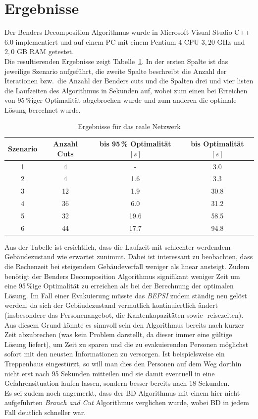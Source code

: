 \documentclass[a4paper, 11pt]{scrreprt}
\begin{document}
\section{Ergebnisse}
Der Benders Decomposition Algorithmus wurde in Microsoft Visual Studio C++ 6.0 implementiert und auf einem
PC mit einem Pentium $4$ CPU $3,20$ GHz und $2,0$ GB RAM getestet.\\
Die resultierenden Ergebnisse zeigt Tabelle~\ref{tab:ergebnisse}. In der ersten Spalte ist das jeweilige
Szenario aufgeführt, die zweite Spalte beschreibt die Anzahl der Iterationen bzw.\ die Anzahl der Benders
cuts und die Spalten drei und vier listen die Laufzeiten des Algorithmus in Sekunden auf, wobei
zum einen bei Erreichen von 95\,\%iger Optimalität abgebrochen wurde und zum anderen die optimale Lösung
berechnet wurde.
\begin{table}[htb!]
\centering
\caption{Ergebnisse für das reale Netzwerk}
\label{tab:ergebnisse}
\begin{tabular}[c]{|c|c|c|c|}\hline
  Szenario & Anzahl Cuts & bis 95\,\% Optimalität $[s]$ & bis Optimalität $[s]$  \\\hline\hline
  1 &  4 & -    &  3.0 \\\hline
  2 &  4 & 1.6  &  3.3 \\\hline
  3 & 12 & 1.9  & 30.8 \\\hline
  4 & 36 & 6.0  & 31.2 \\\hline
  5 & 32 & 19.6 & 58.5 \\\hline
  6 & 44 & 17.7 & 94.8 \\\hline
\end{tabular}
\end{table}
Aus der Tabelle ist ersichtlich, dass die Laufzeit mit schlechter werdendem Gebäudezustand
wie erwartet zunimmt.
Dabei ist interessant zu beobachten, dass die Rechenzeit bei steigendem Gebäudeverfall
weniger als linear ansteigt. Zudem benötigt der Benders Decomposition Algorithmus signifikant
weniger Zeit um eine 95\,\%ige Optimalität zu erreichen als bei der Berechnung der optimalen
Lösung. Im Fall einer Evakuierung müsste das \textit{BEPSI} zudem ständig neu gelöst werden,
da sich der Gebäudezustand vermutlich kontinuiertlich ändert (insbesondere das Personenangebot, die
Kantenkapazitäten sowie -reisezeiten).
Aus diesem Grund könnte es sinnvoll sein den Algorithmus bereits nach kurzer Zeit
abzubrechen (was kein Problem darstellt, da dieser immer eine gültige Lösung liefert),
um Zeit zu sparen und die zu evakuierenden Personen möglichst sofort mit den neusten Informationen zu versorgen.
Ist beispielsweise ein Treppenhaus eingestürzt, so will man dies den Personen auf dem Weg
dorthin nicht erst nach 95 Sekunden mitteilen und sie damit eventuell in eine Gefahrensituation
laufen lassen, sondern besser bereits nach 18 Sekunden.\\
Es sei zudem noch angemerkt, dass der BD Algorithmus mit einem hier nicht aufgeführten
\textit{Branch and Cut} Algorithmus verglichen wurde, wobei BD in jedem Fall deutlich
schneller war.
\end{document}
